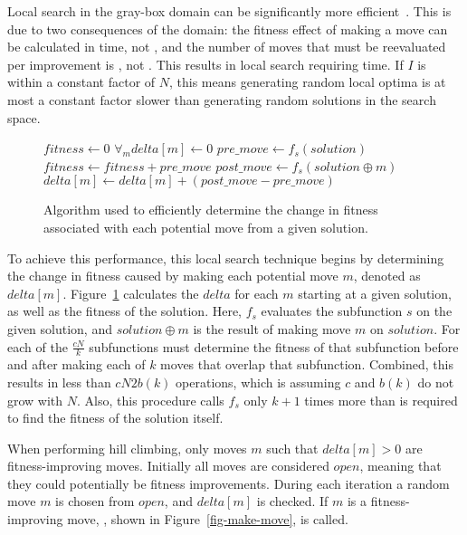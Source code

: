Local search in the gray-box domain can be significantly more efficient~\cite{whitley:2013:greedy}. This is due
to two consequences of the domain: the fitness effect of making a move can be calculated in  time, not ,
and the number of moves that must be reevaluated per improvement is , not . This results in local
search requiring  time. If $I$ is within a constant factor of $N$, this means generating random local
optima is at most a constant factor slower than generating random solutions in the search space.

\begin{figure}
  \begin{algorithmic}[1]
    \State $fitness \leftarrow 0$
    \State $\forall_{m} delta[m] \leftarrow 0$
      \State $pre\_move \leftarrow f_s(solution)$
      \State $fitness \leftarrow fitness + pre\_move$
        \State $post\_move \leftarrow f_s(solution \oplus m)$
        \State $delta[m] \leftarrow delta[m] + (post\_move - pre\_move)$
      \EndFor
    \EndFor
  \EndProcedure
\end{algorithmic}
  \caption{Algorithm used to efficiently determine the change in fitness
           associated with each potential move from a given solution.}
  \label{fig-initialize-delta}
\end{figure}

To achieve this performance, this local search technique begins by
determining the change in fitness caused by making each potential move
$m$, denoted as $delta[m]$. Figure~\ref{fig-initialize-delta}
calculates the $delta$ for each $m$ starting at a given solution, as
well as the fitness of the solution.  Here, $f_s$ evaluates the
subfunction $s$ on the given solution, and $solution \oplus m$ is the
result of making move $m$ on $solution$.  For each of the
$\frac{cN}{k}$ subfunctions  must determine
the fitness of that subfunction before and after making each of $k$
moves that overlap that subfunction. Combined,
this results in less than $cN2b(k)$ operations, which is 
assuming $c$ and $b(k)$ do not grow with $N$.  Also, this procedure
calls $f_s$ only $k+1$ times more than is required to find the fitness
of the solution itself.

When performing hill climbing, only moves $m$ such that $delta[m] > 0$
are fitness-improving moves. Initially all moves are considered
$open$, meaning that they could potentially be fitness
improvements. 
During each iteration a random move $m$ is chosen from $open$,
and $delta[m]$ is checked. If $m$ is a fitness-improving move,
, shown in Figure~\ref{fig-make-move}, is called.

